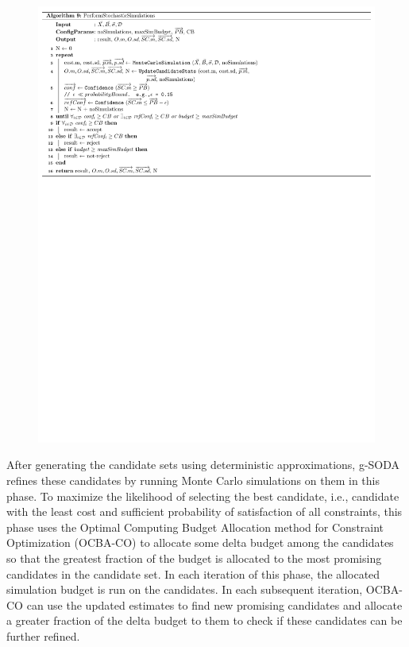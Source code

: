 \documentclass[a4paper, 12pt]{article} %
\begin{document}
\begin{figure}
\begin{minipage}[b]{0.45\textwidth}
\begin{center}
		\includegraphics[width=1\textwidth]{pseudoCode/Algo9.pdf}
	\end{center}
	\end{minipage}
\end{figure}

After generating the candidate sets using deterministic approximations, g-SODA refines these candidates by running Monte Carlo simulations on them in this phase. 
To maximize the likelihood of selecting the best candidate, i.e., candidate with the least cost and sufficient probability of satisfaction of all constraints, this phase uses the Optimal Computing Budget Allocation method for Constraint Optimization (OCBA-CO) \cite{Lee2012OCBACO} to allocate some delta budget among the candidates so that the greatest fraction of the budget is allocated to the most promising candidates in the candidate set. In each iteration of this phase, the allocated simulation budget is run on the candidates.
In each subsequent iteration, OCBA-CO can use the updated estimates to find new promising candidates and allocate a greater fraction of the delta budget to them to check if these candidates can be further refined.
\end{document}
